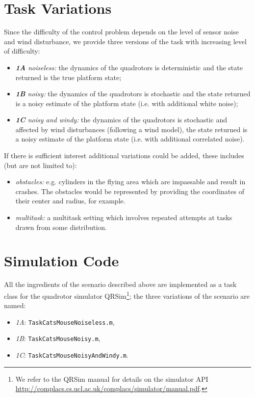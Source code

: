 \documentclass[a4paper,11pt]{report}
\newcommand{\sname}{QRSim\xspace}
\newcommand{\webman}{\url{http://complacs.cs.ucl.ac.uk/complacs/simulator/manual.pdf}\xspace}
\newcommand\mytexttt[1]{\texttt{\hyphenchar\font=45\relax #1}}
\begin{document}
\section{Task Variations} \label{CatMouseVariations}
 Since the difficulty of the control problem depends on the level of sensor noise and wind disturbance, we provide three versions of the task with increasing level of difficulty:
\begin{itemize}
 \item \textit{\textbf{1A} noiseless:} the dynamics of the quadrotors is deterministic and the state returned is the true platform state;
 \item \textit{\textbf{1B} noisy:} the dynamics of the quadrotors is stochastic and the state returned is a noisy estimate of the platform state (i.e. with additional white noise);
 \item \textit{\textbf{1C} noisy and windy:} the dynamics of the quadrotors is stochastic and affected by wind disturbances (following a wind model), the state returned is a noisy estimate of the platform state (i.e. with additional correlated noise).
\end{itemize}

If there is sufficient interest additional variations could be added, these includes (but are not limited to):
\begin{itemize} 
\item \textit{obstacles:} e.g. cylinders in the flying area which are impassable and result in crashes. The obstacles would be represented by providing the coordinates of their center and radius, for example.
\item \textit{multitask:} a multitask setting which involves repeated attempts at tasks drawn from some distribution.
\end{itemize}


\section{Simulation Code}\label{CatMouseSim}
All the ingredients of the scenario described above are implemented as a task class for the quadrotor simulator \sname\footnote{We refer to the \sname manual for details on the simulator API \webman.}; the three variations of the scenario are named:
\begin{itemize}
\item\textit{1A}: \mytexttt{TaskCatsMouseNoiseless.m},
\item\textit{1B}: \mytexttt{TaskCatsMouseNoisy.m},
\item\textit{1C}: \mytexttt{TaskCatsMouseNoisyAndWindy.m}. 
\end{itemize}
\end{document}

